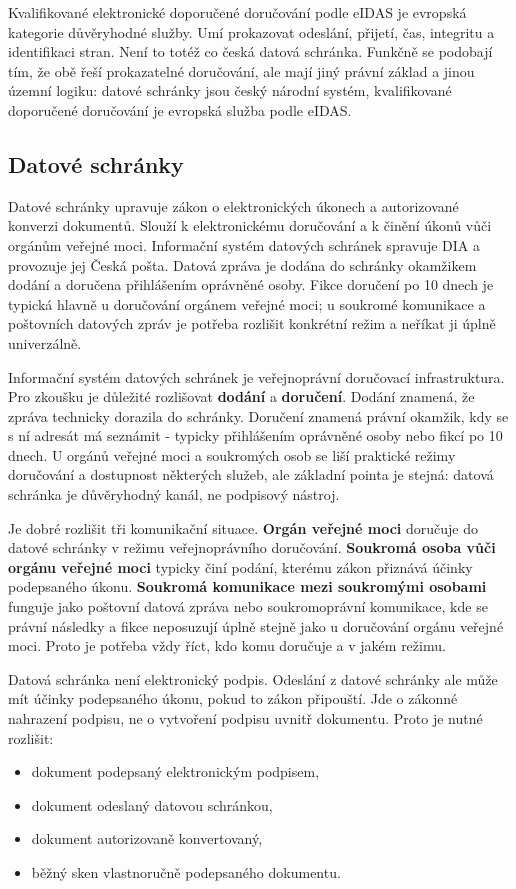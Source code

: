 \documentclass[11pt,a4paper]{article}
\begin{document}
Kvalifikované elektronické doporučené doručování podle eIDAS je evropská kategorie důvěryhodné služby. Umí prokazovat odeslání, přijetí, čas, integritu a identifikaci stran. Není to totéž co česká datová schránka. Funkčně se podobají tím, že obě řeší prokazatelné doručování, ale mají jiný právní základ a jinou územní logiku: datové schránky jsou český národní systém, kvalifikované doporučené doručování je evropská služba podle eIDAS.

\subsection*{Datové schránky}
Datové schránky upravuje zákon o elektronických úkonech a autorizované konverzi dokumentů. Slouží k elektronickému doručování a k činění úkonů vůči orgánům veřejné moci. Informační systém datových schránek spravuje DIA a provozuje jej Česká pošta. Datová zpráva je dodána do schránky okamžikem dodání a doručena přihlášením oprávněné osoby. Fikce doručení po 10 dnech je typická hlavně u doručování orgánem veřejné moci; u soukromé komunikace a poštovních datových zpráv je potřeba rozlišit konkrétní režim a neříkat ji úplně univerzálně.

Informační systém datových schránek je veřejnoprávní doručovací infrastruktura. Pro zkoušku je důležité rozlišovat \textbf{dodání} a \textbf{doručení}. Dodání znamená, že zpráva technicky dorazila do schránky. Doručení znamená právní okamžik, kdy se s ní adresát má seznámit - typicky přihlášením oprávněné osoby nebo fikcí po 10 dnech. U orgánů veřejné moci a soukromých osob se liší praktické režimy doručování a dostupnost některých služeb, ale základní pointa je stejná: datová schránka je důvěryhodný kanál, ne podpisový nástroj.

Je dobré rozlišit tři komunikační situace. \textbf{Orgán veřejné moci} doručuje do datové schránky v režimu veřejnoprávního doručování. \textbf{Soukromá osoba vůči orgánu veřejné moci} typicky činí podání, kterému zákon přiznává účinky podepsaného úkonu. \textbf{Soukromá komunikace mezi soukromými osobami} funguje jako poštovní datová zpráva nebo soukromoprávní komunikace, kde se právní následky a fikce neposuzují úplně stejně jako u doručování orgánu veřejné moci. Proto je potřeba vždy říct, kdo komu doručuje a v jakém režimu.

Datová schránka není elektronický podpis. Odeslání z datové schránky ale může mít účinky podepsaného úkonu, pokud to zákon připouští. Jde o zákonné nahrazení podpisu, ne o vytvoření podpisu uvnitř dokumentu. Proto je nutné rozlišit:
\begin{itemize}
  \item dokument podepsaný elektronickým podpisem,
  \item dokument odeslaný datovou schránkou,
  \item dokument autorizovaně konvertovaný,
  \item běžný sken vlastnoručně podepsaného dokumentu.
\end{itemize}
\end{document}
